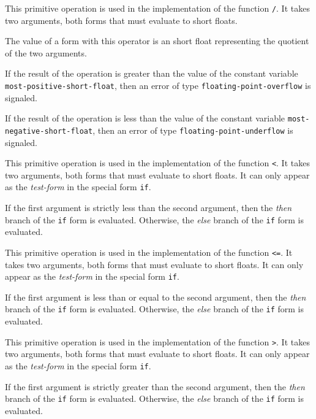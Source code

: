  {}

This primitive operation is used in the implementation of the
\commonlisp{} function \texttt{/}.  It takes two arguments, both forms
that must evaluate to short floats.

The value of a form with this operator is an short float
representing the quotient of the two arguments.

If the result of the operation is greater than the value of the
constant variable \texttt{most-positive-short-float}, then an error of
type \texttt{floating-point-overflow} is signaled.

If the result of the operation is less than the value of the constant
variable \texttt{most-negative-short-float}, then an error of type
\texttt{floating-point-underflow} is signaled.

 {}

This primitive operation is used in the implementation of the
\commonlisp{} function \texttt{<}.  It takes two arguments, both forms
that must evaluate to short floats.  It can only appear as the
\emph{test-form} in the special form \texttt{if}.

If the first argument is strictly less than the second argument, then
the \emph{then} branch of the \texttt{if} form is evaluated.
Otherwise, the \emph{else} branch of the \texttt{if} form is
evaluated.

 {}

This primitive operation is used in the implementation of the
\commonlisp{} function \texttt{<=}.  It takes two arguments, both forms
that must evaluate to short floats.  It can only appear as the
\emph{test-form} in the special form \texttt{if}.

If the first argument is less than or equal to the second argument,
then the \emph{then} branch of the \texttt{if} form is evaluated.
Otherwise, the \emph{else} branch of the \texttt{if} form is
evaluated.

 {}

This primitive operation is used in the implementation of the
\commonlisp{} function \texttt{>}.  It takes two arguments, both forms
that must evaluate to short floats.  It can only appear as the
\emph{test-form} in the special form \texttt{if}.

If the first argument is strictly greater than the second argument,
then the \emph{then} branch of the \texttt{if} form is evaluated.
Otherwise, the \emph{else} branch of the \texttt{if} form is
evaluated.

